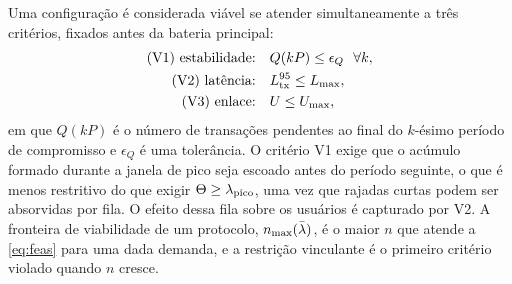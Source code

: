 Uma configuração é considerada viável se atender simultaneamente a três critérios, fixados antes da bateria principal:
\begin{align}
\text{(V1) estabilidade:} \quad & Q(kP) \leq \epsilon_{Q}\ \ \forall k, \nonumber\\
\text{(V2) latência:} \quad & L^{95}_{\mathrm{tx}} \leq L_{\max}, \label{eq:feas}\\
\text{(V3) enlace:} \quad & U \leq U_{\max}, \nonumber
\end{align}
em que $Q(kP)$ é o número de transações pendentes ao final do $k$-ésimo período de compromisso e $\epsilon_{Q}$ é uma tolerância. O critério V1 exige que o acúmulo formado durante a janela de pico seja escoado antes do período seguinte, o que é menos restritivo do que exigir $\Theta \geq \lambda_{\mathrm{pico}}$, uma vez que rajadas curtas podem ser absorvidas por fila. O efeito dessa fila sobre os usuários é capturado por V2. A fronteira de viabilidade de um protocolo, $n_{\max}(\bar{\lambda})$, é o maior $n$ que atende a \eqref{eq:feas} para uma dada demanda, e a restrição vinculante é o primeiro critério violado quando $n$ cresce. 
